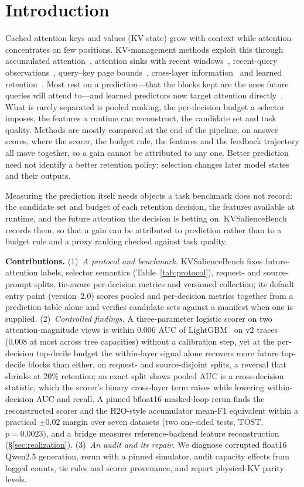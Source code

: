 \section{Introduction}
Cached attention keys and values (KV state) grow with context while attention
concentrates on few positions. KV-management methods exploit this through accumulated
attention~\cite{h2o}, attention sinks with recent windows~\cite{streamingllm},
recent-query observations~\cite{snapkv}, query--key page bounds~\cite{quest},
cross-layer information~\cite{infinigen} and learned retention~\cite{locret}.
Most rest on a prediction---that the blocks kept are the ones future queries will
attend to---and learned predictors now target attention
directly~\cite{attentionpredictor}. What is rarely separated is pooled ranking, the
per-decision budget a selector imposes, the features a runtime can reconstruct, the
candidate set and task quality. Methods are mostly compared at the end of the
pipeline, on answer scores, where the scorer, the budget rule, the features and the
feedback trajectory all move together, so a gain cannot be attributed to any one.
Better prediction need not identify a better retention policy: selection changes
later model states and their outputs.

Measuring the prediction itself needs objects a task benchmark does not record: the
candidate set and budget of each retention decision, the features available at
runtime, and the future attention the decision is betting on. KVSalienceBench records
them, so that a gain can be attributed to prediction rather than to a budget rule and a
proxy ranking checked against task quality.

\textbf{Contributions.} (1)~\emph{A protocol and benchmark.} KVSalienceBench fixes
future-attention labels, selector semantics (Table~\ref{tab:protocol}), request-
and source-prompt splits, tie-aware per-decision metrics and versioned collection;
its default entry point (version~2.0) scores pooled and per-decision metrics together
from a prediction table alone and verifies candidate sets against a manifest when one
is supplied.
(2)~\emph{Controlled findings.} A three-parameter logistic scorer on two
attention-magnitude views is within 0.006 AUC of LightGBM~\cite{ke2017lightgbm} on v2
traces (0.008 at most across tree capacities) without a calibration step, yet at the
per-decision top-decile budget the within-layer signal alone recovers more future
top-decile blocks than either, on request- and source-disjoint splits, a reversal that
shrinks at 20\% retention; an exact split shows pooled AUC is a cross-decision
statistic, which the scorer's binary cross-layer term raises while lowering
within-decision AUC and recall. A pinned bfloat16 masked-loop rerun finds the
reconstructed scorer and the H2O-style accumulator mean-F1 equivalent within a
practical $\pm0.02$ margin over seven datasets (two one-sided tests, TOST,
$p=0.0023$), and a bridge measures reference-backend feature reconstruction
(\S\ref{sec:realization}). (3)~\emph{An audit
and its repair.} We diagnose corrupted float16 Qwen2.5 generation, rerun with a pinned
simulator, audit capacity effects from logged counts, tie rules and scorer provenance,
and report physical-KV parity levels.
